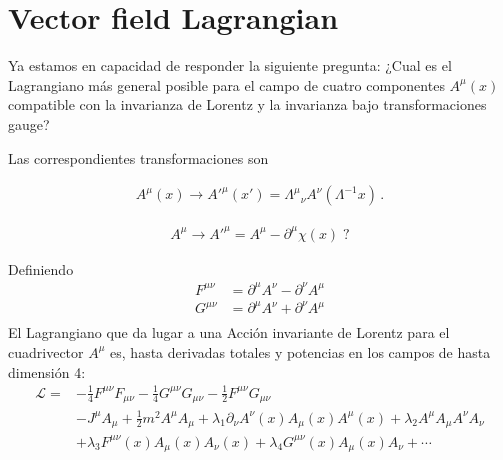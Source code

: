 \section{Vector field Lagrangian}
\begin{frame}
Ya estamos en capacidad de responder la siguiente pregunta: ¿Cual es el Lagrangiano más general posible para el campo de cuatro componentes $A^{\mu}(x)$ compatible con la invarianza de Lorentz y la invarianza bajo transformaciones gauge?

Las correspondientes transformaciones son

\begin{align}
  A^\mu(x)\to {A'}^\mu(x')={\Lambda^\mu}_\nu A^\nu(\Lambda^{-1}x)\,.
\end{align}


\begin{align}
\label{eq:172qft}
  A^\mu\to{A'}^\mu=A^\mu-\partial^\mu\chi(x)\;?
\end{align}




Definiendo
\begin{align*}
  F^{\mu\nu}&=\partial^\mu A^\nu-\partial^\nu A^\mu\\
  G^{\mu\nu}&=\partial^\mu A^\nu+\partial^\nu A^\mu\\
\end{align*}
El Lagrangiano que da lugar a una Acción invariante de Lorentz para el cuadrivector $A^\mu$
es, hasta derivadas totales y potencias en los campos de hasta dimensión 4:
\begin{align}
  \mathcal{L}=&-\frac{1}{4}F^{\mu\nu}F_{\mu\nu}-\frac{1}{4}G^{\mu\nu}G_{\mu\nu}-\frac{1}{2}F^{\mu\nu}G_{\mu\nu}\nonumber\\
&-J^\mu A_\mu+
 \frac{1}{2}m^2A^\mu A_\mu +\lambda_1\partial_\nu A^\nu(x) A_\mu(x) A^\mu(x)+\lambda_2 A^\mu A_\mu A^\nu A_\nu\nonumber\\
&+\lambda_3 F^{\mu\nu}(x)A_\mu(x) A_\nu(x)+\lambda_4G^{\mu\nu}(x)A_\mu(x) A_\nu+\cdots
  \label{eq:lagAmu}
\end{align}
\end{frame}

